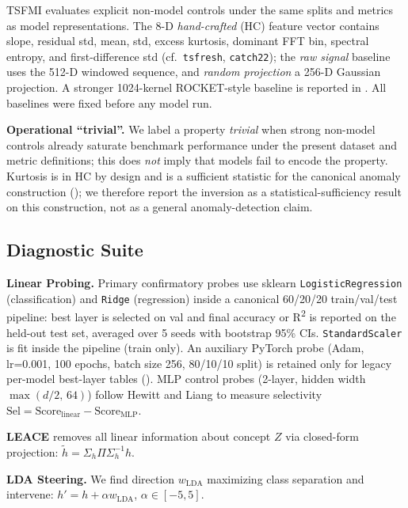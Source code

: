 \documentclass{article}
\begin{document}
TSFMI evaluates explicit non-model controls under the same splits and metrics as model representations. The 8-D \emph{hand-crafted} (HC) feature vector contains slope, residual std, mean, std, excess kurtosis, dominant FFT bin, spectral entropy, and first-difference std (cf.\ \texttt{tsfresh}, \texttt{catch22}); the \emph{raw signal} baseline uses the 512-D windowed sequence, and \emph{random projection} a 256-D Gaussian projection. A stronger 1024-kernel ROCKET-style baseline is reported in . All baselines were fixed before any model run.

\textbf{Operational ``trivial''.} We label a property \emph{trivial} when strong non-model controls already saturate benchmark performance under the present dataset and metric definitions; this does \emph{not} imply that models fail to encode the property. Kurtosis is in HC by design and is a sufficient statistic for the canonical anomaly construction (); we therefore report the inversion as a statistical-sufficiency result on this construction, not as a general anomaly-detection claim.

\subsection{Diagnostic Suite}

\textbf{Linear Probing.} Primary confirmatory probes use sklearn \texttt{LogisticRegression} (classification) and \texttt{Ridge} (regression) inside a canonical 60/20/20 train/val/test pipeline: best layer is selected on val and final accuracy or R\textsuperscript{2} is reported on the held-out test set, averaged over 5 seeds with bootstrap 95\% CIs. \texttt{StandardScaler} is fit inside the pipeline (train only). An auxiliary PyTorch probe (Adam, lr=0.001, 100 epochs, batch size 256, 80/10/10 split) is retained only for legacy per-model best-layer tables (). MLP control probes (2-layer, hidden width $\max(d/2,\,64)$) follow Hewitt and Liang \cite{HewittLiang2019} to measure selectivity $\text{Sel} = \text{Score}_{\text{linear}} - \text{Score}_{\text{MLP}}$.

\textbf{LEACE} \cite{Belrose2023} removes all linear information about concept $Z$ via closed-form projection: $\tilde{h} = \Sigma_{h} \Pi \Sigma_{h}^{-1} h$.

\textbf{LDA Steering.} We find direction $w_{\text{LDA}}$ maximizing class separation and intervene: $h' = h + \alpha w_{\text{LDA}}$, $\alpha \in [-5, 5]$.
\end{document}
